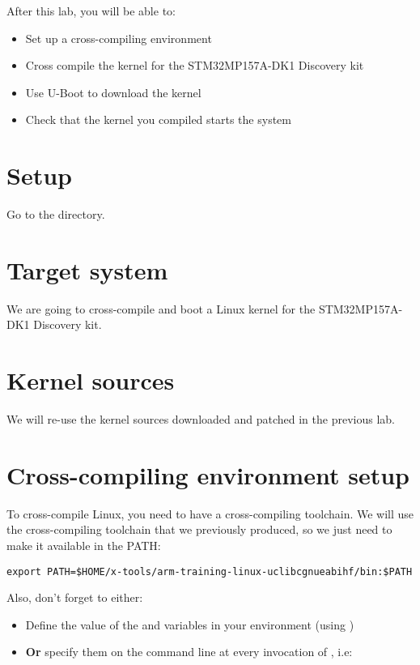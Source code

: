 
After this lab, you will be able to:
\begin{itemize}
\item Set up a cross-compiling environment
\item Cross compile the kernel for the STM32MP157A-DK1 Discovery kit
\item Use U-Boot to download the kernel
\item Check that the kernel you compiled starts the system
\end{itemize}

\section{Setup}

Go to the  directory.

\section{Target system}

We are going to cross-compile and boot a Linux kernel for the
STM32MP157A-DK1 Discovery kit.

\section{Kernel sources}

We will re-use the kernel sources downloaded and patched in the
previous lab.

\section{Cross-compiling environment setup}

To cross-compile Linux, you need to have a cross-compiling
toolchain. We will use the cross-compiling toolchain that we
previously produced, so we just need to make it available in the PATH:

\begin{verbatim}
export PATH=$HOME/x-tools/arm-training-linux-uclibcgnueabihf/bin:$PATH
\end{verbatim}

Also, don't forget to either:

\begin{itemize}
\item Define the value of the  and 
  variables in your environment (using )
\item {\bf Or} specify them on the command line at every invocation of
  , i.e: 
\end{itemize}

